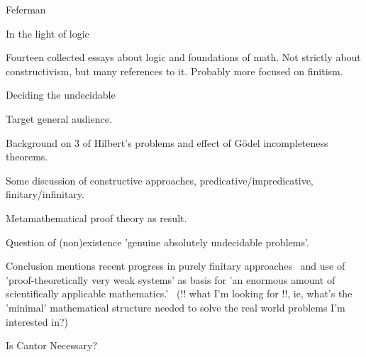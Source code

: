 \begin{plSection}{Feferman}
\label{sec:Feferman}

\begin{plSection}{In the light of logic}
\label{sec:In_the_light_of_logic}

Fourteen collected essays about logic and foundations of 
math. 
Not strictly about constructivism, but many references to it.
Probably more focused on finitism.

\begin{plSection}{Deciding the undecidable}
\label{sec:Deciding_the_undecidable}


Target general audience.

Background on $3$ of Hilbert's problems
and effect of G\"{o}del incompleteness theorems.

Some discussion of constructive approaches, 
predicative/impredicative, finitary/infinitary.

Metamathematical proof theory as result.

Question of (non)existence 
'genuine absolutely undecidable problems'.

Conclusion mentions recent progress
in purely finitary approaches~\cite[ch.~10]{Feferman:1998:LightOfLogic}
and 
use of 'proof-theoretically very weak systems'
as basis for 'an enormous amount of scientifically applicable
mathematics.'~\cite[ch.~14]{Feferman:1998:LightOfLogic}
(!! what I'm looking for !!, ie, 
what's the 'minimal' mathematical structure needed to
solve the real world problems I'm interested in?)

\end{plSection}%
\begin{plSection}{Is Cantor Necessary?}
\label{sec:Is_Cantor_Necessary}



\end{plSection}
\end{plSection}
\end{plSection}

